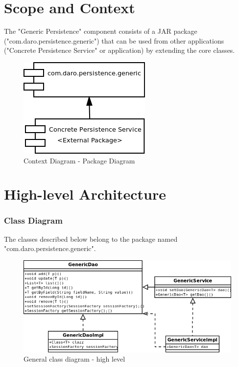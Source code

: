 \documentclass[a4paper,11pt]{book}
\begin{document}
\section{Scope and Context}
The "Generic Persistence" component consists of a JAR package ("com.daro.persistence.generic") that can be used from other applications ("Concrete Persistence Service" or application) by extending the core classes.

\begin{figure}[h] %
  \includegraphics{generic_persistence_package_diagram}
  \caption{Context Diagram - Package Diagram}
  \centering
  \label{fig:context} %
\end{figure}

\section{High-level Architecture}

\pagebreak
\subsubsection{Class Diagram}
The classes described below belong to the package named "com.daro.persistence.generic".

\begin{figure}[h] %
  \includegraphics[width=\textwidth]{generic_persistence_class_diagram}
  \caption{General class diagram - high level}
  \centering
  \label{fig:generic_persistence_class_diagram} %
\end{figure}
\end{document}
